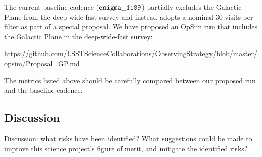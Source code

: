 The current baseline cadence (${\tt enigma\_1189}$) partially excludes the Galactic Plane from the deep-wide-fast survey and instead adopts a 
nominal 30 visits per filter as part of a special proposal. We have proposed an OpSim run that includes the Galactic Plane in the 
deep-wide-fast survey:

\url{https://github.com/LSSTScienceCollaborations/ObservingStrategy/blob/master/opsim/Proposal_GP.md}

The metrics listed above should be carefully compared between our proposed run and the baseline cadence.



\subsection{Discussion}
\label{sec:keyword:MW_Disk_discussion}

Discussion: what risks have been identified? What suggestions could be
made to improve this science project's figure of merit, and mitigate
the identified risks?



\navigationbar
